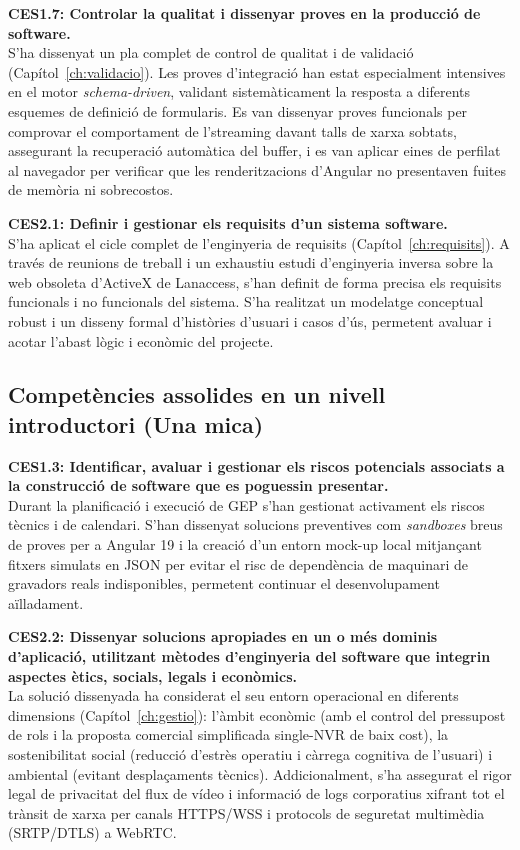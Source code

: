 \noindent \textbf{CES1.7: Controlar la qualitat i dissenyar proves en la producció de software.}\\
S'ha dissenyat un pla complet de control de qualitat i de validació (Capítol~\ref{ch:validacio}). Les proves d'integració han estat especialment intensives en el motor \textit{schema-driven}, validant sistemàticament la resposta a diferents esquemes de definició de formularis. Es van dissenyar proves funcionals per comprovar el comportament de l'streaming davant talls de xarxa sobtats, assegurant la recuperació automàtica del buffer, i es van aplicar eines de perfilat al navegador per verificar que les renderitzacions d'Angular no presentaven fuites de memòria ni sobrecostos.

\noindent \textbf{CES2.1: Definir i gestionar els requisits d'un sistema software.}\\
S'ha aplicat el cicle complet de l'enginyeria de requisits (Capítol~\ref{ch:requisits}). A través de reunions de treball i un exhaustiu estudi d'enginyeria inversa sobre la web obsoleta d'ActiveX de Lanaccess, s'han definit de forma precisa els requisits funcionals i no funcionals del sistema. S'ha realitzat un modelatge conceptual robust i un disseny formal d'històries d'usuari i casos d'ús, permetent avaluar i acotar l'abast lògic i econòmic del projecte.

\subsection{Competències assolides en un nivell introductori (Una mica)}

\noindent \textbf{CES1.3: Identificar, avaluar i gestionar els riscos potencials associats a la construcció de software que es poguessin presentar.}\\
Durant la planificació i execució de GEP s'han gestionat activament els riscos tècnics i de calendari. S'han dissenyat solucions preventives com \textit{sandboxes} breus de proves per a Angular 19 i la creació d'un entorn mock-up local mitjançant fitxers simulats en JSON per evitar el risc de dependència de maquinari de gravadors reals indisponibles, permetent continuar el desenvolupament aïlladament.

\noindent \textbf{CES2.2: Dissenyar solucions apropiades en un o més dominis d'aplicació, utilitzant mètodes d'enginyeria del software que integrin aspectes ètics, socials, legals i econòmics.}\\
La solució dissenyada ha considerat el seu entorn operacional en diferents dimensions (Capítol~\ref{ch:gestio}): l'àmbit econòmic (amb el control del pressupost de rols i la proposta comercial simplificada single-NVR de baix cost), la sostenibilitat social (reducció d'estrès operatiu i càrrega cognitiva de l'usuari) i ambiental (evitant desplaçaments tècnics). Addicionalment, s'ha assegurat el rigor legal de privacitat del flux de vídeo i informació de logs corporatius xifrant tot el trànsit de xarxa per canals HTTPS/WSS i protocols de seguretat multimèdia (SRTP/DTLS) a WebRTC.

